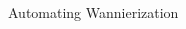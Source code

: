 \documentclass[xcolor=table,aspectratio=169]{beamer}
\numberwithin{equation}{section}
\begin{document}
\begin{frame}{Automating Wannierization}

   \begin{columns}
      \begin{column}{0.5\textwidth}
         \begin{overlayarea}{\columnwidth}{0.6\paperheight}
         \begin{center}

\end{center}
\end{overlayarea}
\end{column}
\end{columns}
\end{frame}
\end{document}
